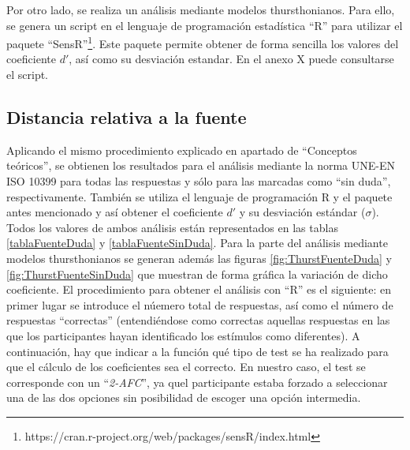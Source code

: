 \documentclass[11pt,a4paper,twoside]{book}
\begin{document}
        Por otro lado, se realiza un análisis mediante modelos thursthonianos. Para ello, se genera un script en el lenguaje de programación estadística ``R'' para utilizar el paquete ``SensR''\footnote{https://cran.r-project.org/web/packages/sensR/index.html}. Este paquete permite obtener de forma sencilla los valores del coeficiente $d'$, así como su desviación estandar. En el anexo X puede consultarse el script.
        
        
		\subsection{Distancia relativa a la fuente}
		    Aplicando el mismo procedimiento explicado en apartado de ``Conceptos teóricos'', se obtienen los resultados para el análisis mediante la norma UNE-EN ISO 10399 para todas las respuestas y sólo para las marcadas como ``sin duda'', respectivamente. También se utiliza el lenguaje de programación R y el paquete antes mencionado y así obtener el coeficiente $d'$ y su desviación estándar ($\sigma$). Todos los valores de ambos análisis están representados en las tablas \ref{tablaFuenteDuda} y \ref{tablaFuenteSinDuda}. Para la parte del análisis mediante modelos thursthonianos se generan además las figuras \ref{fig:ThurstFuenteDuda} y \ref{fig:ThurstFuenteSinDuda} que muestran de forma gráfica la variación de dicho coeficiente. El procedimiento para obtener el análisis con ``R'' es el siguiente: en primer lugar se introduce el núemero total de respuestas, así como el número de respuestas ``correctas'' (entendiéndose como correctas aquellas respuestas en las que los participantes hayan identificado los estímulos como diferentes). A continuación, hay que indicar a la función qué tipo de test se ha realizado para que el cálculo de los coeficientes sea el correcto. En nuestro caso, el test se corresponde con un ``\textit{2-AFC}'', ya quel participante estaba forzado a seleccionar una de las dos opciones sin posibilidad de escoger una opción intermedia.
		    
\end{document}
